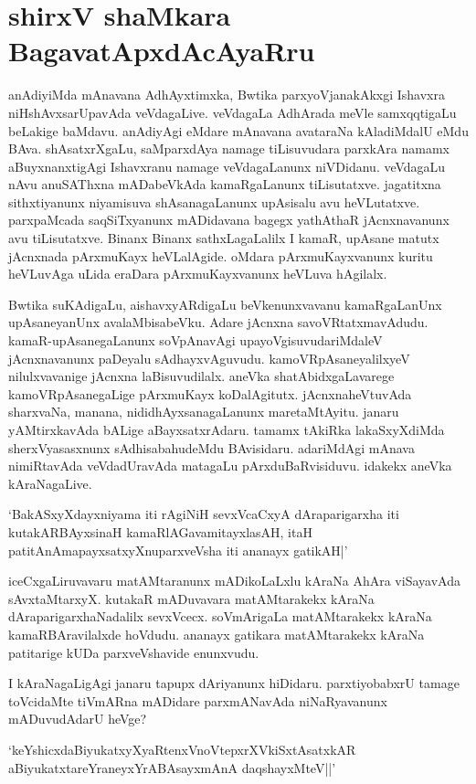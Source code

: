 \chapter{shirxV shaMkara BagavatApxdAcAyaRru}\label{chap3}

anAdiyiMda mAnavana AdhAyxtimxka, Bwtika parxyoVjanakAkxgi Ishavxra niHshAvxsarUpavAda veVdagaLive. veVdagaLa AdhArada meVle samxqqtigaLu beLakige baMdavu. anAdiyAgi eMdare mAnavana avataraNa kAladiMdalU eMdu BAva. shAsatxrXgaLu, saMparxdAya namage tiLisuvudara parxkAra namamx aBuyxnanxtigAgi Ishavxranu namage veVdagaLanunx niVDidanu. veVdagaLu nAvu anuSAThxna mADabeVkAda kamaRgaLanunx tiLisutatxve. jagatitxna sithxtiyanunx niyamisuva shAsanagaLanunx upAsisalu avu heVLutatxve. parxpaMcada saqSiTxyanunx mADidavana bagegx yathAthaR jAcnxnavanunx avu tiLisutatxve. Binanx Binanx sathxLagaLalilx I kamaR, upAsane matutx jAcnxnada pArxmuKayx heVLalAgide. oMdara pArxmuKayxvanunx kuritu heVLuvAga uLida eraDara pArxmuKayxvanunx heVLuva hAgilalx.

Bwtika suKAdigaLu, aishavxyARdigaLu beVkenunxvavanu kamaRgaLanUnx upAsaneyanUnx avalaMbisabeVku. Adare jAcnxna savoVRtatxmavAdudu. kamaR-upAsanegaLanunx soVpAnavAgi upayoVgisuvudariMdaleV jAcnxnavanunx paDeyalu sAdhayxvAguvudu. kamoVRpAsaneyalilxyeV nilulxvavanige jAcnxna laBisuvudilalx. aneVka shatAbidxgaLavarege kamoVRpAsanegaLige pArxmuKayx koDalAgitutx. jAcnxnaheVtuvAda sharxvaNa, manana, nididhAyxsanagaLanunx maretaMtAyitu. janaru yAMtirxkavAda bALige aBayxsatxrAdaru. tamamx tAkiRka lakaSxyXdiMda sherxVyasasxnunx sAdhisabahudeMdu BAvisidaru. adariMdAgi mAnava nimiRtavAda veVdadUravAda matagaLu pArxduBaRvisiduvu. idakekx aneVka kAraNagaLive.

`BakASxyXdayxniyama iti rAgiNiH sevxVcaCxyA dAraparigarxha iti kutakARBAyxsinaH kamaRlAGavamitayxlasAH, itaH patitAnAmapayxsatxyXnuparxveVsha iti ananayx gatikAH|'

iceCxgaLiruvavaru matAMtaranunx mADikoLaLxlu kAraNa AhAra viSayavAda sAvxtaMtarxyX. kutakaR mADuvavara matAMtarakekx kAraNa dAraparigarxhaNadalilx sevxVcecx. soVmArigaLa matAMtarakekx kAraNa kamaRBAravilalxde hoVdudu. ananayx gatikara matAMtarakekx kAraNa patitarige kUDa parxveVshavide enunxvudu.

I kAraNagaLigAgi janaru tapupx dAriyanunx hiDidaru. parxtiyobabxrU tamage toVcidaMte tiVmARna mADidare parxmANavAda niNaRyavanunx mADuvudAdarU heVge?

\begin{shloka}
`keYshicxdaBiyukatxyXyaRtenxVnoVtepxrXVkiSxtAsatxkAR\\
aBiyukatxtareYraneyxYrABAsayxmAnA daqshayxMteV||'
\end{shloka}

